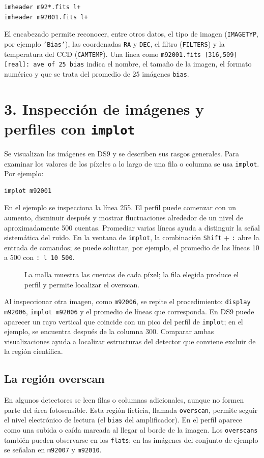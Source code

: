 \documentclass[11pt,twocolumn]{article}
\newcommand{\widefigure}[2]{\begin{figure}[!t]\centering\caption{#2}\end{figure}}
\begin{document}
\begin{verbatim}
imheader m92*.fits l+
imheader m92001.fits l+
\end{verbatim}

El encabezado permite reconocer, entre otros datos, el tipo de imagen
(\texttt{IMAGETYP}, por ejemplo \texttt{'Bias'}), las coordenadas
\texttt{RA} y \texttt{DEC}, el filtro (\texttt{FILTERS}) y la temperatura del
CCD (\texttt{CAMTEMP}). Una línea como
\texttt{m92001.fits [316,509][real]: ave of 25 bias} indica el nombre, el
tamaño de la imagen, el formato numérico y que se trata del promedio de 25
imágenes \texttt{bias}.

\section*{3. Inspección de imágenes y perfiles con \texttt{implot}}

Se visualizan las imágenes en DS9 y se describen sus rasgos generales. Para
examinar los valores de los píxeles a lo largo de una fila o columna se usa
\texttt{implot}. Por ejemplo:

\begin{verbatim}
implot m92001
\end{verbatim}

En el ejemplo se inspecciona la línea 255. El perfil puede comenzar con un
aumento, disminuir después y mostrar fluctuaciones alrededor de un nivel de
aproximadamente 500 cuentas. Promediar varias líneas ayuda a distinguir la
señal sistemática del ruido. En la ventana de \texttt{implot}, la combinación
\texttt{Shift} + \texttt{:} abre la entrada de comandos; se puede solicitar,
por ejemplo, el promedio de las líneas 10 a 500 con \texttt{: l 10 500}.

\widefigure{figuras/perfil_implot.tex}{La malla muestra las cuentas de cada píxel; la fila elegida produce el perfil y permite localizar el overscan.}

Al inspeccionar otra imagen, como \texttt{m92006}, se repite el procedimiento:
\texttt{display m92006}, \texttt{implot m92006} y el promedio de líneas que
corresponda. En DS9 puede aparecer un rayo vertical que coincide con un pico
del perfil de \texttt{implot}; en el ejemplo, se encuentra después de la
columna 300. Comparar ambas visualizaciones ayuda a localizar estructuras del
detector que conviene excluir de la región científica.

\subsection*{La región overscan}
En algunos detectores se leen filas o columnas adicionales, aunque no formen
parte del área fotosensible. Esta región ficticia, llamada \texttt{overscan},
permite seguir el nivel electrónico de lectura (el \texttt{bias} del
amplificador). En el perfil aparece como una subida o caída marcada al llegar
al borde de la imagen. Los \texttt{overscans} también pueden observarse en los
\texttt{flats}; en las imágenes del conjunto de ejemplo se señalan en
\texttt{m92007} y \texttt{m92010}.
\end{document}
